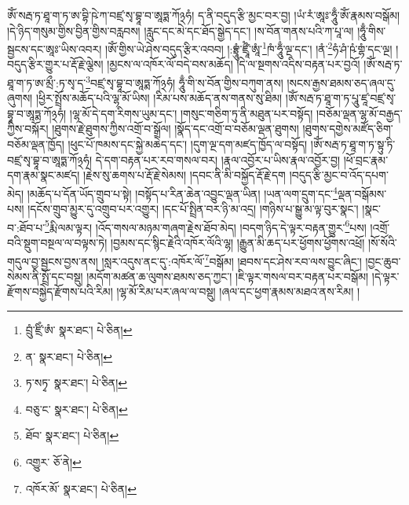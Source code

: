 ཨོཾ་སརྦ་ཏ་ཐཱ་ག་ཏ་ཨ་བྷི་ཥེ་ཀ་བཛྲ་སྭ་བྷཱ་བ་ཨཱཏྨ་ཀོ྅ཧཾ། ད་ནི་བདུད་རྩི་མྱང་བར་བྱ། །ཡཾ་རཾ་ཨཱཿ་ཧཱུྃ་ཨོཾ་རྣམས་བསྒོམ། །དེ་ཉིད་གསུམ་གྱིས་བྱིན་གྱིས་བརླབས། །རླུང་དང་མེ་དང་ཐོད་སྒྱེད་དང་། །ས་བོན་གནས་པའི་ཀ་པཱ་ལ། །ཧཱུྃ་གིས་སྦྱངས་དང་ཨཱཿ་ཡིས་འབར། །ཨོཾ་གྱིས་ཡེ་ཤེས་བདུད་རྩིར་འབབ། །:བྷྲཱུཾ་ཛྲཱྀཾ་ཨཱཾ་\footnote{བྲུཾ་ཛྲིཾ་ཨཾ་  སྣར་ཐང་།  པེ་ཅིན། }ཁཾ་ཧཱུྃ་ལྔ་དང་། །ནཾ་\footnote{ན་  སྣར་ཐང་།  པེ་ཅིན། }ཧཾ་ཤཾ་ཥཾ་གྷཾ་དང་ལྔ། །བདུད་རྩིར་གྱུར་པ་རྡོ་རྗེ་ལྕེས། །མྱངས་ལ་འཁོར་ལོ་བདེ་བས་མཆོད། །དེ་ལ་སྔགས་འདིས་བརྟན་པར་བྱའོ། །ཨོཾ་སརྦ་ཏ་ཐཱ་ག་ཏ་ཨ་མྲྀ་:ཏ་སྭ་ད་\footnote{ཏ་སཏྭ་  སྣར་ཐང་།  པེ་ཅིན། }བཛྲ་སྭ་བྷཱ་བ་ཨཱཏྨ་ཀོ྅ཧཾ། ཧཱུྃ་གི་ས་བོན་གྱིས་བཀུག་ནས། །སངས་རྒྱས་ཐམས་ཅད་ཞལ་དུ་ཞུགས། །ཕྱིར་སྤྲོས་མཆོད་པའི་ལྷ་མོ་ཡིས། །རིམ་པས་མཆོད་ནས་གནས་སུ་ཐིམ། །ཨོཾ་སརྦ་ཏ་ཐཱ་ག་ཏ་པཱུ་ཛཱ་བཛྲ་སྭ་བྷཱ་བ་ཨཱཏྨ་ཀོ྅ཧཾ། །ལྷ་མོ་དེ་དག་རིགས་ཡུམ་དང་། །གསུང་གཅིག་ཏུ་ནི་མཐུན་པར་བསྟོད། །བཅོམ་ལྡན་ལྷ་མོ་བརྒྱད་ཀྱིས་བསྐོར། །ཐུགས་རྗེ་ཐུགས་ཀྱིས་འགྲོ་བ་སྒྲོལ། །སྣོད་དང་འགྲོ་བ་བཅོམ་ལྡན་ཐུགས། །ཐུགས་དགྱེས་མཛོད་ཅིག་བཅོམ་ལྡན་ཁྱོད། །ཕུང་པོ་ཁམས་དང་སྐྱེ་མཆེད་དང་། །དུག་ལྔ་དག་མཛད་ཁྱོད་ལ་བསྟོད། །ཨོཾ་སརྦ་ཏ་ཐཱ་ག་ཏ་སྟུ་ཏི་བཛྲ་སྭ་བྷཱ་བ་ཨཱཏྨ་ཀོ྅ཧཾ། དེ་དག་བརྟན་པར་རབ་གསལ་བར། །རྣལ་འབྱོར་པ་ཡིས་རྣལ་འབྱོར་བྱ། །ཕོ་བྲང་རྣམ་དག་རྣམ་སྣང་མཛད། །རྗེས་སུ་ཆགས་པ་རྡོ་རྗེ་སེམས། །དབང་ནི་མི་བསྐྱོད་རྡོ་རྗེ་དག །བདུད་རྩི་མྱང་བ་འོད་དཔག་མེད། །མཆོད་པ་དོན་ཡོད་གྲུབ་པ་སྟེ། །བསྟོད་པ་རིན་ཆེན་འབྱུང་ལྡན་ཡིན། །ཡན་ལག་དྲུག་དང་\footnote{བཅུ་ང་  སྣར་ཐང་།  པེ་ཅིན། }ལྡན་བསྒོམས་པས། །དངོས་གྲུབ་མྱུར་དུ་འགྲུབ་པར་འགྱུར། །དང་པོ་སྤྲིན་བར་ཉི་མ་འདྲ། །གཉིས་པ་སྒྱུ་མ་ལྟ་བུར་སྣང་། །སྣང་བ་:ཐོབ་པ་\footnote{ཐོབ་  སྣར་ཐང་།  པེ་ཅིན། }རྨི་ལམ་ལྟར། །འོད་གསལ་མཉམ་གཞག་རྗེས་ཐོབ་མེད། །བདག་ཉིད་དེ་ལྟར་བརྟན་གྱུར་\footnote{འགྱུར་  ཅོ་ནེ། }པས། །འགྲོ་བའི་སྡུག་བསྔལ་ལ་བལྟས་ཏེ། །བྱམས་དང་སྙིང་རྗེའི་འཁོར་ལོའི་ལྷ། །རྒྱུན་མི་ཆད་པར་ཕྱོགས་ཕྱོགས་འཕྲོ། །སོ་སོའི་གདུལ་བྱ་སྦྱངས་བྱས་ནས། །སླར་འདུས་ནང་དུ་:འཁོར་ལོ་\footnote{འཁོར་མོ་  སྣར་ཐང་།  པེ་ཅིན། }བསྒོམ། །ཐབས་དང་ཤེས་རབ་ལས་བྱུང་ཞིང་། །བྱང་ཆུབ་སེམས་ནི་སྤྲོ་དང་བསྡུ། །མདོག་མཚན་ཆ་ལུགས་ཐམས་ཅད་ཀྱང་། །ཇི་ལྟར་གསལ་བར་བརྟན་པར་བསྒོམ། །དེ་ལྟར་རྫོགས་བསྐྱེད་རྫོགས་པའི་རིམ། །ལྷ་མོ་རིམ་པར་ཞལ་ལ་བསྡུ། །ཞལ་དང་ཕྱག་རྣམས་མཐའ་ནས་རིམ། །
